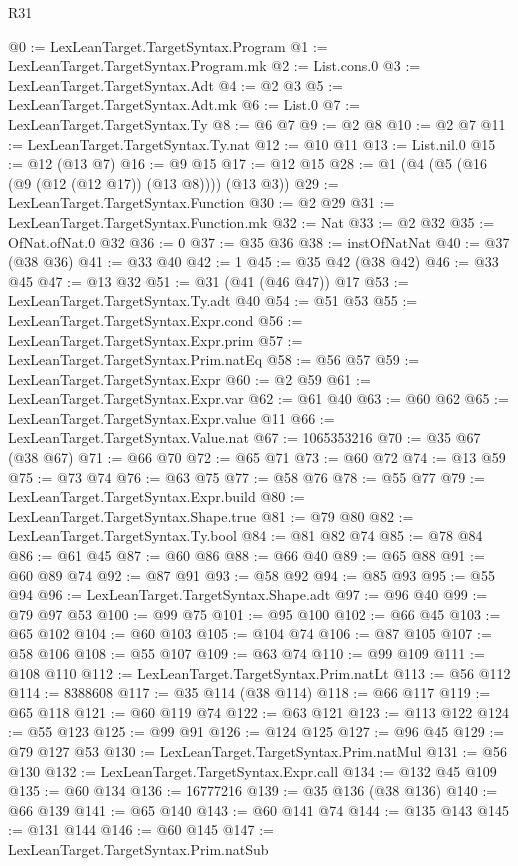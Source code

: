 \begin{lexlean}{R31}
\begin{coremodule}
@0 := LexLeanTarget.TargetSyntax.Program
@1 := LexLeanTarget.TargetSyntax.Program.mk
@2 := List.cons.{0}
@3 := LexLeanTarget.TargetSyntax.Adt
@4 := @2 @3
@5 := LexLeanTarget.TargetSyntax.Adt.mk
@6 := List.{0}
@7 := LexLeanTarget.TargetSyntax.Ty
@8 := @6 @7
@9 := @2 @8
@10 := @2 @7
@11 := LexLeanTarget.TargetSyntax.Ty.nat
@12 := @10 @11
@13 := List.nil.{0}
@15 := @12 (@13 @7)
@16 := @9 @15
@17 := @12 @15
@28 := @1 (@4 (@5 (@16 (@9 (@12 (@12 @17)) (@13 @8)))) (@13 @3))
@29 := LexLeanTarget.TargetSyntax.Function
@30 := @2 @29
@31 := LexLeanTarget.TargetSyntax.Function.mk
@32 := Nat
@33 := @2 @32
@35 := OfNat.ofNat.{0} @32
@36 := 0
@37 := @35 @36
@38 := instOfNatNat
@40 := @37 (@38 @36)
@41 := @33 @40
@42 := 1
@45 := @35 @42 (@38 @42)
@46 := @33 @45
@47 := @13 @32
@51 := @31 (@41 (@46 @47)) @17
@53 := LexLeanTarget.TargetSyntax.Ty.adt @40
@54 := @51 @53
@55 := LexLeanTarget.TargetSyntax.Expr.cond
@56 := LexLeanTarget.TargetSyntax.Expr.prim
@57 := LexLeanTarget.TargetSyntax.Prim.natEq
@58 := @56 @57
@59 := LexLeanTarget.TargetSyntax.Expr
@60 := @2 @59
@61 := LexLeanTarget.TargetSyntax.Expr.var
@62 := @61 @40
@63 := @60 @62
@65 := LexLeanTarget.TargetSyntax.Expr.value @11
@66 := LexLeanTarget.TargetSyntax.Value.nat
@67 := 1065353216
@70 := @35 @67 (@38 @67)
@71 := @66 @70
@72 := @65 @71
@73 := @60 @72
@74 := @13 @59
@75 := @73 @74
@76 := @63 @75
@77 := @58 @76
@78 := @55 @77
@79 := LexLeanTarget.TargetSyntax.Expr.build
@80 := LexLeanTarget.TargetSyntax.Shape.true
@81 := @79 @80
@82 := LexLeanTarget.TargetSyntax.Ty.bool
@84 := @81 @82 @74
@85 := @78 @84
@86 := @61 @45
@87 := @60 @86
@88 := @66 @40
@89 := @65 @88
@91 := @60 @89 @74
@92 := @87 @91
@93 := @58 @92
@94 := @85 @93
@95 := @55 @94
@96 := LexLeanTarget.TargetSyntax.Shape.adt
@97 := @96 @40
@99 := @79 @97 @53
@100 := @99 @75
@101 := @95 @100
@102 := @66 @45
@103 := @65 @102
@104 := @60 @103
@105 := @104 @74
@106 := @87 @105
@107 := @58 @106
@108 := @55 @107
@109 := @63 @74
@110 := @99 @109
@111 := @108 @110
@112 := LexLeanTarget.TargetSyntax.Prim.natLt
@113 := @56 @112
@114 := 8388608
@117 := @35 @114 (@38 @114)
@118 := @66 @117
@119 := @65 @118
@121 := @60 @119 @74
@122 := @63 @121
@123 := @113 @122
@124 := @55 @123
@125 := @99 @91
@126 := @124 @125
@127 := @96 @45
@129 := @79 @127 @53
@130 := LexLeanTarget.TargetSyntax.Prim.natMul
@131 := @56 @130
@132 := LexLeanTarget.TargetSyntax.Expr.call
@134 := @132 @45 @109
@135 := @60 @134
@136 := 16777216
@139 := @35 @136 (@38 @136)
@140 := @66 @139
@141 := @65 @140
@143 := @60 @141 @74
@144 := @135 @143
@145 := @131 @144
@146 := @60 @145
@147 := LexLeanTarget.TargetSyntax.Prim.natSub

\end{coremodule}
\end{lexlean}
